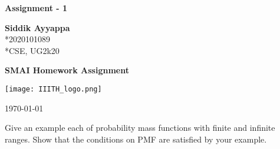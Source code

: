 \documentclass[10pt, a4paper]{article}
\begin{document}
\begin{titlepage}
    \begin{center}
        \vspace*{3cm}
            
        \Huge
        \textbf{Assignment - 1}
            
            
        \vspace{1.5cm}
        \Large
            
        \textbf{Siddik Ayyappa}                      %
        \\*{2020101089}
        \\*{CSE, UG2k20}
            
        \vfill
        
        \textbf{SMAI Homework Assignment}
            
        \vspace{1cm}
            
        \texttt{[image: IIITH\_logo.png]}
        \\
        
        \Large
        
        \today
            
    \end{center}
\end{titlepage}


\newpage
\begin{Problem}
Give an example each of probability mass functions with finite and infinite ranges. Show that the conditions on PMF are satisfied by your example.
\end{Problem}
    
\end{document}
